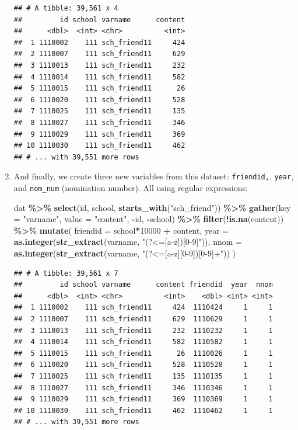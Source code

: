 \documentclass[
]{book}
\newenvironment{Shaded}{\begin{snugshade}}{\end{snugshade}}
\newcommand{\AttributeTok}[1]{\textcolor[rgb]{0.13,0.29,0.53}{#1}}
\newcommand{\DecValTok}[1]{\textcolor[rgb]{0.00,0.00,0.81}{#1}}
\newcommand{\FunctionTok}[1]{\textcolor[rgb]{0.13,0.29,0.53}{\textbf{#1}}}
\newcommand{\NormalTok}[1]{#1}
\newcommand{\SpecialCharTok}[1]{\textcolor[rgb]{0.81,0.36,0.00}{\textbf{#1}}}
\newcommand{\StringTok}[1]{\textcolor[rgb]{0.31,0.60,0.02}{#1}}
\begin{document}
\begin{enumerate}
\begin{verbatim}
## # A tibble: 39,561 x 4
##         id school varname      content
##      <dbl>  <int> <chr>          <int>
##  1 1110002    111 sch_friend11     424
##  2 1110007    111 sch_friend11     629
##  3 1110013    111 sch_friend11     232
##  4 1110014    111 sch_friend11     582
##  5 1110015    111 sch_friend11      26
##  6 1110020    111 sch_friend11     528
##  7 1110025    111 sch_friend11     135
##  8 1110027    111 sch_friend11     346
##  9 1110029    111 sch_friend11     369
## 10 1110030    111 sch_friend11     462
## # ... with 39,551 more rows
\end{verbatim}
\item
  And finally, we create three new variables from this dataset: \texttt{friendid,}, \texttt{year}, and \texttt{nom\_num} (nomination number). All using regular expressions:

\begin{Shaded}
\begin{Highlighting}[]
\NormalTok{dat }\SpecialCharTok{\%\textgreater{}\%} 
  \FunctionTok{select}\NormalTok{(id, school, }\FunctionTok{starts\_with}\NormalTok{(}\StringTok{"sch\_friend"}\NormalTok{)) }\SpecialCharTok{\%\textgreater{}\%}
  \FunctionTok{gather}\NormalTok{(}\AttributeTok{key =} \StringTok{"varname"}\NormalTok{, }\AttributeTok{value =} \StringTok{"content"}\NormalTok{, }\SpecialCharTok{{-}}\NormalTok{id, }\SpecialCharTok{{-}}\NormalTok{school) }\SpecialCharTok{\%\textgreater{}\%}
  \FunctionTok{filter}\NormalTok{(}\SpecialCharTok{!}\FunctionTok{is.na}\NormalTok{(content)) }\SpecialCharTok{\%\textgreater{}\%}
  \FunctionTok{mutate}\NormalTok{(}
    \AttributeTok{friendid =}\NormalTok{ school}\SpecialCharTok{*}\DecValTok{10000} \SpecialCharTok{+}\NormalTok{ content,}
    \AttributeTok{year     =} \FunctionTok{as.integer}\NormalTok{(}\FunctionTok{str\_extract}\NormalTok{(varname, }\StringTok{"(?\textless{}=[a{-}z])[0{-}9]"}\NormalTok{)),}
    \AttributeTok{nnom     =} \FunctionTok{as.integer}\NormalTok{(}\FunctionTok{str\_extract}\NormalTok{(varname, }\StringTok{"(?\textless{}=[a{-}z][0{-}9])[0{-}9]+"}\NormalTok{))}
\NormalTok{    )}
\end{Highlighting}
\end{Shaded}

\begin{verbatim}
## # A tibble: 39,561 x 7
##         id school varname      content friendid  year  nnom
##      <dbl>  <int> <chr>          <int>    <dbl> <int> <int>
##  1 1110002    111 sch_friend11     424  1110424     1     1
##  2 1110007    111 sch_friend11     629  1110629     1     1
##  3 1110013    111 sch_friend11     232  1110232     1     1
##  4 1110014    111 sch_friend11     582  1110582     1     1
##  5 1110015    111 sch_friend11      26  1110026     1     1
##  6 1110020    111 sch_friend11     528  1110528     1     1
##  7 1110025    111 sch_friend11     135  1110135     1     1
##  8 1110027    111 sch_friend11     346  1110346     1     1
##  9 1110029    111 sch_friend11     369  1110369     1     1
## 10 1110030    111 sch_friend11     462  1110462     1     1
## # ... with 39,551 more rows
\end{verbatim}


\end{enumerate}
\end{document}
